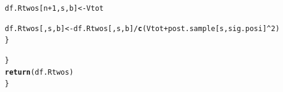 \documentclass[11pt,a4paper,twoside]{book}\usepackage[]{graphicx}\usepackage[]{color}
\makeatletter
\newcommand{\hlnum}[1]{\textcolor[rgb]{0.686,0.059,0.569}{#1}}%
\newcommand{\hlopt}[1]{\textcolor[rgb]{0,0,0}{#1}}%
\newcommand{\hlstd}[1]{\textcolor[rgb]{0.345,0.345,0.345}{#1}}%
\newcommand{\hlkwb}[1]{\textcolor[rgb]{0.69,0.353,0.396}{#1}}%
\newcommand{\hlkwd}[1]{\textcolor[rgb]{0.737,0.353,0.396}{\textbf{#1}}}%
\newenvironment{kframe}{%
 \def\at@end@of@kframe{}%
 \ifinner\ifhmode%
  \def\at@end@of@kframe{\end{minipage}}%
  \begin{minipage}{\columnwidth}%
 \fi\fi%
 \def\FrameCommand##1{\hskip\@totalleftmargin \hskip-\fboxsep
 \colorbox{shadecolor}{##1}\hskip-\fboxsep
     \hskip-\linewidth \hskip-\@totalleftmargin \hskip\columnwidth}%
 \MakeFramed {\advance\hsize-\width
   \@totalleftmargin\z@ \linewidth\hsize
   \@setminipage}}%
 {\par\unskip\endMakeFramed%
 \at@end@of@kframe}
\newenvironment{knitrout}{}{} %
\makeatother
\begin{document}
\begin{codeenv}
\begin{knitrout}
\begin{kframe}
\begin{alltt}
            \hlstd{df.Rtwos[n} \hlopt{+} \hlnum{1}\hlstd{, s, b]} \hlkwb{<-} \hlstd{Vtot}

            \hlstd{df.Rtwos[, s, b]} \hlkwb{<-} \hlstd{df.Rtwos[, s, b]}\hlopt{/}\hlkwd{c}\hlstd{(Vtot} \hlopt{+} \hlstd{post.sample[s, sig.posi]}\hlopt{^}\hlnum{2}\hlstd{)}
        \hlstd{\}}

    \hlstd{\}}
    \hlkwd{return}\hlstd{(df.Rtwos)}
\hlstd{\}}
\end{alltt}
\end{kframe}
\end{knitrout}
	\end{codeenv}








 


\cleardoublepage
\end{document}
